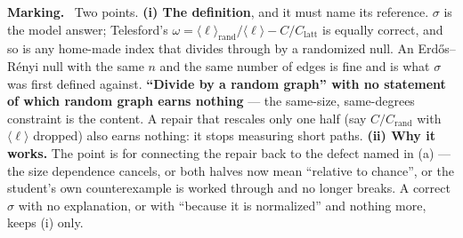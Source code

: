 \documentclass[a4paper, 12pt]{extarticle}
\newenvironment{grading}
  {\begin{tcolorbox}[colback=pltblue!4, colframe=pltblue!35, boxrule=0.5pt,
                     sharp corners, boxsep=2pt, left=6pt, right=6pt,
                     top=4pt, bottom=4pt]\footnotesize\textbf{Marking.}\ }
  {\end{tcolorbox}}
\begin{document}
\begin{grading}
Two points.
\textbf{(i) The definition}, and it must name its reference. $\sigma$ is the
model answer; Telesford's
$\omega = \langle\ell\rangle_{\text{rand}}/\langle\ell\rangle - C/C_{\text{latt}}$
is equally correct, and so is any home-made index that divides through by a
randomized null. An Erd\H{o}s--R\'enyi null with the same $n$ and the same
number of edges is fine and is what $\sigma$ was first defined against.
\textbf{``Divide by a random graph'' with no statement of which random graph
earns nothing} --- the same-size, same-degrees constraint is the content.
A repair that rescales only one half (say $C/C_{\text{rand}}$ with
$\langle\ell\rangle$ dropped) also earns nothing: it stops measuring short
paths.
\textbf{(ii) Why it works.} The point is for connecting the repair back to the
defect named in (a) --- the size dependence cancels, or both halves now mean
``relative to chance'', or the student's own counterexample is worked through
and no longer breaks. A correct $\sigma$ with no explanation, or with
``because it is normalized'' and nothing more, keeps (i) only.
\end{grading}
\end{document}
